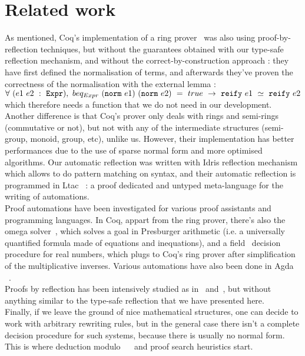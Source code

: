 \section{Related work}
\label{sect:relatedWork}

As mentioned, Coq's implementation of a ring prover~\cite{Coq2005} was also using proof-by-reflection techniques, but without the guarantees obtained with our type-safe reflection mechanism, and without the correct-by-construction approach : they have first defined the normalisation of terms, and afterwards they've proven the correctness of the normalisation with the external lemma :
$\forall\ (e1\ e2\ :\ \code{Expr}),\ beq_{Expr}\ (\code{norm}\ e1)\ (\code{norm}\ e2)\ =\ true\ \rightarrow\ \code{reify}\ e1\ \simeq\ \code{reify}\ e2$ which therefore needs a  function that we do not need in our development. Another difference is that Coq's prover only deals with rings and semi-rings (commutative or not), but not with any of the intermediate structures (semi-group, monoid, group, etc), unlike us. However, their implementation has better performances due to the use of sparse normal form and more optimised algorithms.
Our automatic reflection was written with Idris reflection mechanism which allows to do pattern matching on syntax, and their automatic reflection is programmed in Ltac~\cite{DelahayeLTac} : a proof dedicated and untyped meta-language for the writing of automations. \\

Proof automations have been investigated for various proof assistants and programming languages. In Coq, appart from the ring prover, there's also the omega solver~\cite{Cregut04}, which solves a goal in Presburger arithmetic (i.e. a universally quantified formula made of equations and inequations), and a field~\cite{DelahayeField} decision procedure for real numbers, which plugs to Coq's ring prover after simplification of the multiplicative inverses. Various automations have also been done in Agda~\cite{DBLP:conf/mpc/KokkeS15} ~\cite{Lindblad04}. \\

Proofs by reflection has been intensively studied as in~\cite{ChlipalaBook} and~\cite{Malecha14}, but without anything similar to the type-safe reflection that we have presented here. \\

Finally, if we leave the ground of nice mathematical structures, one can decide to work with arbitrary rewriting rules, but in the general case there isn't a complete decision procedure for such systems, because there is usually no normal form. This is where deduction modulo~\cite{Dowek03} ~\cite{DelahayeModulo} and proof search heuristics start. \\


